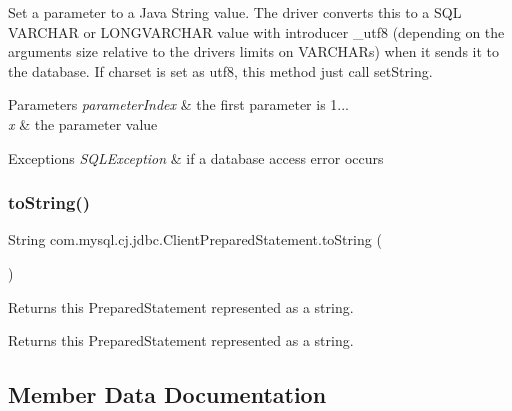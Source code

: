 Set a parameter to a Java String value. The driver converts this to a S\+QL V\+A\+R\+C\+H\+AR or L\+O\+N\+G\+V\+A\+R\+C\+H\+AR value with introducer \+\_\+utf8 (depending on the arguments size relative to the driver\textquotesingle{}s limits on V\+A\+R\+C\+H\+A\+Rs) when it sends it to the database. If charset is set as utf8, this method just call set\+String.


\begin{DoxyParams}{Parameters}
{\em parameter\+Index} & the first parameter is 1... \\
\hline
{\em x} & the parameter value\\
\hline
\end{DoxyParams}

\begin{DoxyExceptions}{Exceptions}
{\em S\+Q\+L\+Exception} & if a database access error occurs \\
\hline
\end{DoxyExceptions}
\mbox{\label{classcom_1_1mysql_1_1cj_1_1jdbc_1_1_client_prepared_statement_adbbbd2407424c34277a0699d7be261b4}} 
\subsubsection{\texorpdfstring{to\+String()}{toString()}}
{\footnotesize\ttfamily String com.\+mysql.\+cj.\+jdbc.\+Client\+Prepared\+Statement.\+to\+String (\begin{DoxyParamCaption}{ }\end{DoxyParamCaption})}

Returns this Prepared\+Statement represented as a string.

\begin{DoxyReturn}{Returns}
this Prepared\+Statement represented as a string. 
\end{DoxyReturn}


\subsection{Member Data Documentation}
\mbox{\label{classcom_1_1mysql_1_1cj_1_1jdbc_1_1_client_prepared_statement_a81277367ad12df00619e0926617c0b7b}} 
